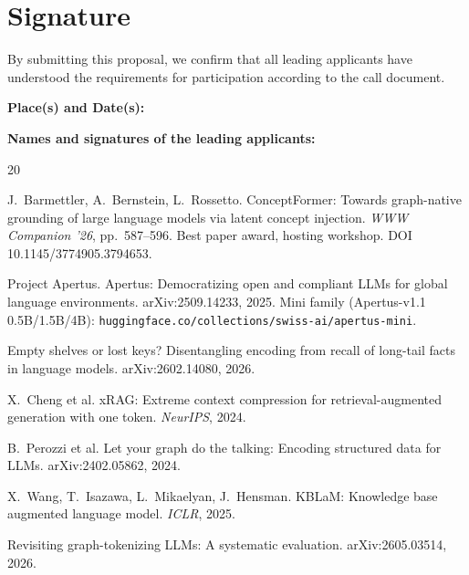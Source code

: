\documentclass[11pt,a4paper]{article}
\begin{document}
\newpage
\section*{Signature}
{By submitting this proposal, we confirm that all leading applicants have understood the
requirements for participation according to the call document.
}
\bigskip

\noindent \textbf{Place(s) and Date(s):}

\bigskip

\noindent \textbf{Names and signatures of the leading applicants:}

\newpage
\renewcommand{\refname}{References}

\begin{thebibliography}{20}
\small

 J.~Barmettler, A.~Bernstein, L.~Rossetto.
ConceptFormer: Towards graph-native grounding of large language models via latent concept
injection. \emph{WWW Companion '26}, pp.~587--596. Best paper award, hosting workshop.
DOI 10.1145/3774905.3794653.

 Project Apertus. Apertus: Democratizing open and compliant LLMs for global
language environments. arXiv:2509.14233, 2025. Mini family (Apertus-v1.1 0.5B/1.5B/4B):
\texttt{huggingface.co/collections/swiss-ai/apertus-mini}.

 Empty shelves or lost keys? Disentangling encoding from recall of
long-tail facts in language models. arXiv:2602.14080, 2026.

 X.~Cheng et al. xRAG: Extreme context compression for retrieval-augmented
generation with one token. \emph{NeurIPS}, 2024.

 B.~Perozzi et al. Let your graph do the talking: Encoding structured data
for LLMs. arXiv:2402.05862, 2024.

 X.~Wang, T.~Isazawa, L.~Mikaelyan, J.~Hensman. KBLaM: Knowledge base augmented
language model. \emph{ICLR}, 2025.

 Revisiting graph-tokenizing LLMs: A systematic evaluation. arXiv:2605.03514,
2026.

\end{thebibliography}
\end{document}
